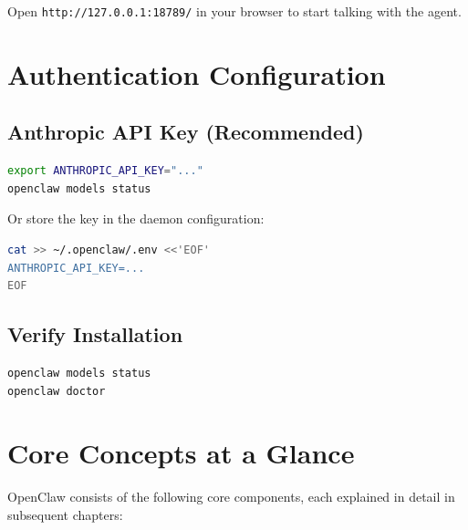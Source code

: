 Open \texttt{http://127.0.0.1:18789/} in your browser to start talking with the agent.

\section{Authentication Configuration}

\subsection{Anthropic API Key (Recommended)}

\begin{lstlisting}[language=bash]
export ANTHROPIC_API_KEY="..."
openclaw models status
\end{lstlisting}

Or store the key in the daemon configuration:

\begin{lstlisting}[language=bash]
cat >> ~/.openclaw/.env <<'EOF'
ANTHROPIC_API_KEY=...
EOF
\end{lstlisting}

\subsection{Verify Installation}

\begin{lstlisting}[language=bash]
openclaw models status
openclaw doctor
\end{lstlisting}

\section{Core Concepts at a Glance}

OpenClaw consists of the following core components, each explained in detail in subsequent chapters:

